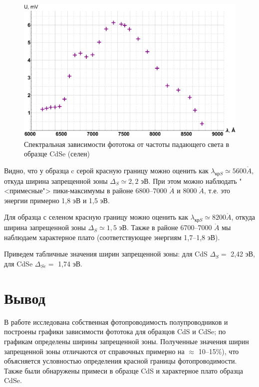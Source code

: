 \documentclass[12pt]{kiarticle}
\newcommand{\an}{\ensuremath{\mathring{A}}}
\begin{document}
\begin{figure}[h]
	\includegraphics[scale=0.47]{se.pdf}
	\caption{Спектральная зависимости фототока от частоты падающего света в образце CdSe (селен)}
	\label{graf_se}
\end{figure}
	
	Видно, что у образца  c серой красную границу можно оценить как $ \lambda_{кр S} \simeq 5600 \an $, откуда ширина запрещенной зоны $ \Delta_S \simeq 2,2 $ эВ. При этом можно наблюдать "<примесные"> пики-максимумы в районе 6800--7000 $ \an $ и $ 8000 \; \an $, т.е. это энергии примерно 1,8 эВ и 1,5 эВ. 
	
	Для образца с селеном красную границу можно оценить как $ \lambda_{кр S} \simeq 8200 \an $, откуда ширина запрещенной зоны $ \Delta_S \simeq 1,5 $ эВ. Также в районе 6700--7000 $ \an $ мы наблюдаем характерное плато (соответствующее энергиям 1,7--1,8 эВ).
	
	Приведем табличные значения ширин запрещенной зоны: для CdS $ \Delta_S =$ 2,42 эВ, для CdSe $ \Delta_{Se} = $ 1,74 эВ.
	
	\section{Вывод }
	
	В работе исследована собственная фотопроводимость полупроводников и построены графики зависимости фототока для образцов CdS и CdSe; по графикам определены ширины запрещенной зоны. Полученные значения ширин запрещенной зоны  отличаются от справочных примерно на $ \approx $ 10--15\%), что объясняется условностью определения красной границы фотопроводимости. Также были обнаружены примеси в образце CdS и характерное плато образца CdSe.
	
\end{document}
